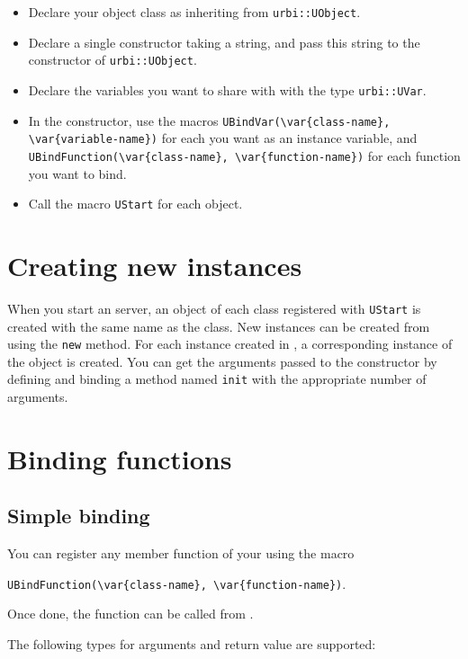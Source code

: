 \begin{itemize}
\item Declare your object class as inheriting from
  \lstinline{urbi::UObject}.
\item Declare a single constructor taking a string, and pass this
  string to the constructor of \lstinline{urbi::UObject}.
\item Declare the variables you want to share with \urbi with the type
  \lstinline{urbi::UVar}.
\item In the constructor, use the macros
  \lstinline|UBindVar(\var{class-name}, \var{variable-name})|
  for each \UVar you want as an instance variable, and
  \lstinline|UBindFunction(\var{class-name}, \var{function-name})| for
  each function you want to bind.
\item Call the macro \lstinline{UStart} for each object.
\end{itemize}

\section{Creating new instances}

When you start an \urbi server, an object of each class registered
with \lstinline{UStart} is created with the same name as the
class. New instances can be created from \urbi using the
\lstinline|new| method. For each instance created in \urbi, a
corresponding instance of the \Cxx object is created. You can get the
arguments passed to the constructor by defining and binding a method
named \lstinline|init| with the appropriate number of arguments.

\section{Binding functions}

\subsection{Simple binding}

You can register any member function of your \UObject using the macro

\lstinline|UBindFunction(\var{class-name}, \var{function-name})|.

Once done, the function can be called from \us.

The following types for arguments and return value are supported:

